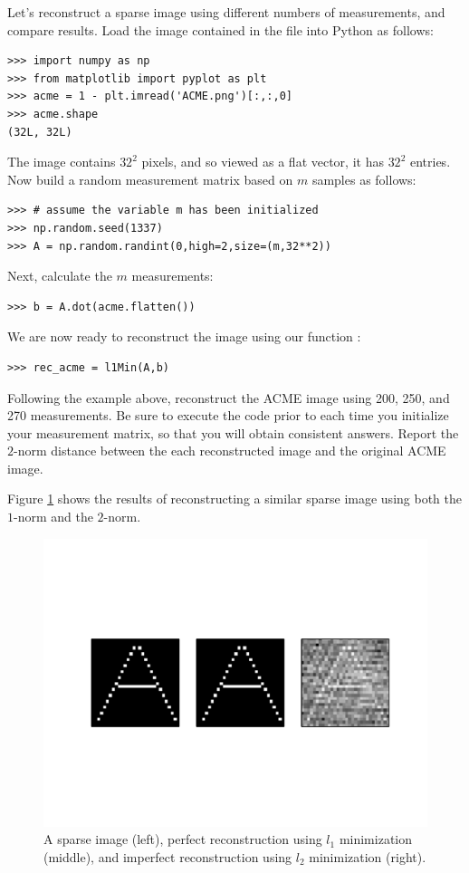 Let's reconstruct a sparse image using different numbers of measurements, and compare results.
Load the image contained in the file  into Python as follows:
\begin{lstlisting}
>>> import numpy as np
>>> from matplotlib import pyplot as plt
>>> acme = 1 - plt.imread('ACME.png')[:,:,0]
>>> acme.shape
(32L, 32L)
\end{lstlisting}
The image contains $32^2$ pixels, and so viewed as a flat vector, it has $32^2$ entries.
Now build a random measurement matrix based on $m$ samples as follows:
\begin{lstlisting}
>>> # assume the variable m has been initialized
>>> np.random.seed(1337)
>>> A = np.random.randint(0,high=2,size=(m,32**2))
\end{lstlisting}
Next, calculate the $m$ measurements:
\begin{lstlisting}
>>> b = A.dot(acme.flatten())
\end{lstlisting}
We are now ready to reconstruct the image using our function :
\begin{lstlisting}
>>> rec_acme = l1Min(A,b)
\end{lstlisting}

\begin{problem}
Following the example above, reconstruct the ACME image using 200, 250, and 270 measurements.
Be sure to execute the code  prior to each time you initialize
your measurement matrix, so that you will obtain consistent answers. Report the $2$-norm
distance between the each reconstructed image and the original ACME image. 
\end{problem}

Figure \ref{fig:reconstruct} shows the results of reconstructing a similar sparse image using both the $1$-norm and 
the $2$-norm.

\begin{figure}
\centering
\includegraphics[width=\textwidth]{reconstruct.pdf}
\caption{A sparse image (left), perfect reconstruction using $l_1$ minimization (middle),  and
imperfect reconstruction using $l_2$ minimization (right).}
\label{fig:reconstruct}
\end{figure}
